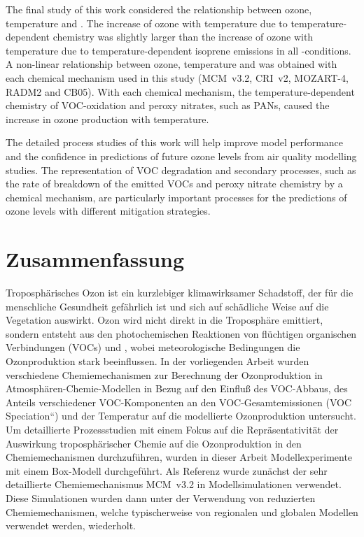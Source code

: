 The final study of this work considered the relationship between ozone, temperature and .
The increase of ozone with temperature due to temperature-dependent chemistry was slightly larger than the increase of ozone with temperature due to temperature-dependent isoprene emissions in all -conditions.
A non-linear relationship between ozone, temperature and  was obtained with each chemical mechanism used in this study (MCM~v3.2, CRI~v2, MOZART-4, RADM2 and CB05).
With each chemical mechanism, the temperature-dependent chemistry of VOC-oxidation and peroxy nitrates, such as PANs, caused the increase in ozone production with temperature.

The detailed process studies of this work will help improve model performance and the confidence in predictions of future ozone levels from air quality modelling studies.
The representation of VOC degradation and secondary processes, such as the rate of breakdown of the emitted VOCs and peroxy nitrate chemistry by a chemical mechanism, are particularly important processes for the predictions of ozone levels with different mitigation strategies.

\section{Zusammenfassung}
Troposphärisches Ozon ist ein kurzlebiger klimawirksamer Schadstoff, der für die menschliche Gesundheit gefährlich ist und sich auf schädliche Weise auf die Vegetation auswirkt.
Ozon wird nicht direkt in die Troposphäre emittiert, sondern entsteht aus den photochemischen Reaktionen von flüchtigen organischen Verbindungen (VOCs) und , wobei meteorologische Bedingungen die Ozonproduktion stark beeinflussen.
In der vorliegenden Arbeit wurden verschiedene Chemiemechanismen zur Berechnung der Ozonproduktion in Atmosphären-Chemie-Modellen in Bezug auf den Einfluß des VOC-Abbaus, des Anteils verschiedener VOC-Komponenten an den VOC-Gesamtemissionen (\quotedblbase VOC Speciation``) und der Temperatur auf die modellierte Ozonproduktion untersucht.
Um detaillierte Prozessstudien mit einem Fokus auf die Repräsentativität der Auswirkung troposphärischer Chemie auf die Ozonproduktion in den Chemiemechanismen durchzuführen, wurden in dieser Arbeit Modellexperimente mit einem Box-Modell durchgeführt.
Als Referenz wurde zunächst der sehr detaillierte Chemiemechanismus MCM~v3.2 in Modellsimulationen verwendet.
Diese Simulationen wurden dann unter der Verwendung von reduzierten Chemiemechanismen, welche typischerweise von regionalen und globalen Modellen verwendet werden, wiederholt. 

